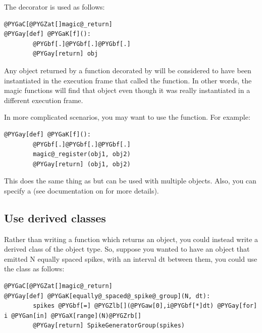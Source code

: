 \documentclass[letterpaper,10pt,english]{manual}
\begin{document}
The \hyperlink{brian.magic_return}{} decorator is used as follows:

\begin{Verbatim}[commandchars=@\[\]]
@PYGaC[@PYGZat[]magic@_return]
@PYGay[def] @PYGaK[f]():
        @PYGbf[.]@PYGbf[.]@PYGbf[.]
        @PYGay[return] obj
\end{Verbatim}

Any object returned by a function decorated by \hyperlink{brian.magic_return}{} will be
considered to have been instantiated in the execution frame that called the
function. In other words, the magic functions will find that object even
though it was really instantiated in a different execution frame.

In more complicated scenarios, you may want to use the \hyperlink{brian.magic_register}{}
function. For example:

\begin{Verbatim}[commandchars=@\[\]]
@PYGay[def] @PYGaK[f]():
        @PYGbf[.]@PYGbf[.]@PYGbf[.]
        magic@_register(obj1, obj2)
        @PYGay[return] (obj1, obj2)
\end{Verbatim}

This does the same thing as \hyperlink{brian.magic_return}{} but can be used with
multiple objects. Also, you can specify a  (see documentation on
\hyperlink{brian.magic_register}{} for more details).

\subsection{Use derived classes}

Rather than writing a function which returns an object, you could instead
write a derived class of the object type. So, suppose you wanted to have an
object that emitted N equally spaced spikes, with an interval dt between
them, you could use the \hyperlink{brian.SpikeGeneratorGroup}{} class as follows:

\begin{Verbatim}[commandchars=@\[\]]
@PYGaC[@PYGZat[]magic@_return]
@PYGay[def] @PYGaK[equally@_spaced@_spike@_group](N, dt):
        spikes @PYGbf[=] @PYGZlb[](@PYGaw[0],i@PYGbf[*]dt) @PYGay[for] i @PYGan[in] @PYGaX[range](N)@PYGZrb[]
        @PYGay[return] SpikeGeneratorGroup(spikes)
\end{Verbatim}
\end{document}

